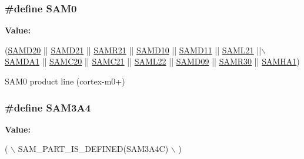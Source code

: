 \subsubsection[{S\+A\+M0}]{\setlength{\rightskip}{0pt plus 5cm}\#define S\+A\+M0}\label{group__sam__part__macros__group_ga5f347b54588ccfc00042a0272f1c0306}
{\bfseries Value\+:}
\begin{DoxyCode}
(\hyperlink{group__sam__part__macros__group_gad9193543e761f5967353a0464dde1e61}{SAMD20} || \hyperlink{group__sam__part__macros__group_gab9217b15071242235d3014381d61dbf7}{SAMD21} || \hyperlink{group__sam__part__macros__group_ga63b66a40b044f5f10d6dfa3ff51a0acb}{SAMR21} || \hyperlink{group__sam__part__macros__group_gac83f6794433f2c57bfc5c520fe3d67ce}{SAMD10} || \hyperlink{group__sam__part__macros__group_ga9e5edb5637174377186d92141e7f60d9}{SAMD11} || 
      \hyperlink{group__sam__part__macros__group_ga38e970d13ac9ee9d74c527ab43bc5c36}{SAML21} ||\hyperlink{group__sam__part__macros__group_ga072dd622eab25246a14ce4a97a3df2df}{\(\backslash\)}
\hyperlink{group__sam__part__macros__group_ga072dd622eab25246a14ce4a97a3df2df}{        SAMDA1} || \hyperlink{group__sam__part__macros__group_gaac043547d8783c0cba34b7d3139c53a0}{SAMC20} || \hyperlink{group__sam__part__macros__group_ga0ebd751fff25acbc104dcaeef418fcff}{SAMC21} || \hyperlink{group__sam__part__macros__group_ga5f904618e9b88b4d9981d6a374b09aa5}{SAML22} || \hyperlink{group__sam__part__macros__group_gafca3f645579e1a67ce865408ecb5269f}{SAMD09} || 
      \hyperlink{group__sam__part__macros__group_gae396c6bd5babec94cd8a290c1ae60a9f}{SAMR30} || \hyperlink{group__sam__part__macros__group_ga801950238d1ae14ecc1f1b41ebc6e392}{SAMHA1})
\end{DoxyCode}
S\+A\+M0 product line (cortex-\/m0+) \hypertarget{group__sam__part__macros__group_ga1f4481b0cd1b2c1a4636999b6a433b9f}{}
\subsubsection[{S\+A\+M3\+A4}]{\setlength{\rightskip}{0pt plus 5cm}\#define S\+A\+M3\+A4}\label{group__sam__part__macros__group_ga1f4481b0cd1b2c1a4636999b6a433b9f}
{\bfseries Value\+:}
\begin{DoxyCode}
( \(\backslash\)
        SAM\_PART\_IS\_DEFINED(SAM3A4C) \(\backslash\)
        )
\end{DoxyCode}
\hypertarget{group__sam__part__macros__group_gab1397a5e346af96e5ed34027ed3b4de8}{}
